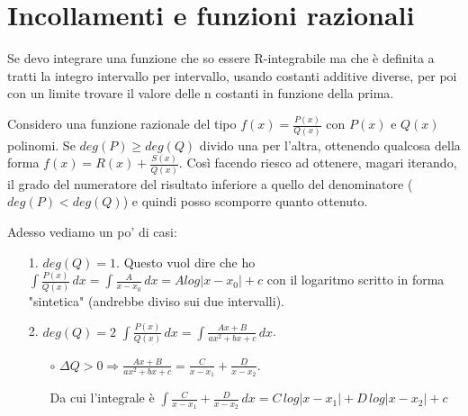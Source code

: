\documentclass{article}
\theoremstyle{definition}
\theoremstyle{definition}
\theoremstyle{definition}
\theoremstyle{definition}
\theoremstyle{definition}
\begin{document}
\newpage
\section{Incollamenti e funzioni razionali}

Se devo integrare una funzione che so essere R-integrabile ma che è definita a tratti la integro intervallo per intervallo, usando costanti additive diverse, per poi con un limite trovare il valore delle n costanti in funzione della prima.

\vspace{3mm}

Considero una funzione razionale del tipo $\displaystyle{f(x)=\frac{P(x)}{Q(x)}}$ con $P(x)$ e $Q(x)$ polinomi. Se $deg(P)\geq deg(Q)$ divido una per l'altra, ottenendo qualcosa della forma $\displaystyle{f(x)=R(x)+\frac{S(x)}{Q(x)}}$. Così facendo riesco ad ottenere, magari iterando, il grado del numeratore del risultato inferiore a quello del denominatore ($deg(P)<deg(Q)$) e quindi posso scomporre quanto ottenuto.

\vspace{3mm}

Adesso vediamo un po' di casi:

\begin{itemize}
    \item [1.] $deg(Q)=1$. 
                \newline
                Questo vuol dire che ho $\displaystyle{\int\frac{P(x)}{Q(x)}\,dx=\int\frac{A}{x-x_0}\,dx=Alog\left|x-x_0\right|+c}$ con il logaritmo scritto in forma "sintetica" (andrebbe diviso sui due intervalli).
    \item [2.] $deg(Q)=2$
                \newline
                $\displaystyle{\int\frac{P(x)}{Q(x)}\,dx=\int\frac{Ax+B}{ax^2+bx+c}\,dx}$.
                \begin{itemize}
                    \item [$\circ$] $\displaystyle{\Delta Q>0 \Rightarrow \frac{Ax+B}{ax^2+bx+c}=\frac{C}{x-x_1}+\frac{D}{x-x_2}}$. 
                    
                    Da cui l'integrale è $\displaystyle{\int\frac{C}{x-x_1}+\frac{D}{x-x_2}\,dx=C\,log\left|x-x_1\right|+D\,log\left|x-x_2\right|+c}$
                \end{itemize}
\end{itemize}   






\end{document}
